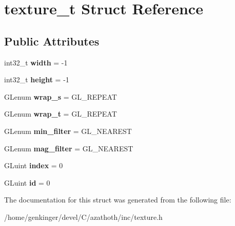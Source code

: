 \hypertarget{structtexture__t}{}\section{texture\+\_\+t Struct Reference}
\label{structtexture__t}
\subsection*{Public Attributes}
\begin{DoxyCompactItemize}
\item 
\mbox{\label{structtexture__t_a44b4ded1610f593b1e101a708d8eed67}} 
int32\+\_\+t {\bfseries width} = -\/1
\item 
\mbox{\label{structtexture__t_a864afa42205fa8cf7fcaef9b1aa972fd}} 
int32\+\_\+t {\bfseries height} = -\/1
\item 
\mbox{\label{structtexture__t_aa15f8e13840f041263afbe8dd7edf741}} 
G\+Lenum {\bfseries wrap\+\_\+s} = G\+L\+\_\+\+R\+E\+P\+E\+AT
\item 
\mbox{\label{structtexture__t_aac1199de3d773ce80db151382a6a3f1b}} 
G\+Lenum {\bfseries wrap\+\_\+t} = G\+L\+\_\+\+R\+E\+P\+E\+AT
\item 
\mbox{\label{structtexture__t_a718f2c925f57709837570351ded3e55f}} 
G\+Lenum {\bfseries min\+\_\+filter} = G\+L\+\_\+\+N\+E\+A\+R\+E\+ST
\item 
\mbox{\label{structtexture__t_a8fa4a06e9236cd45a65a8c330ffb66f4}} 
G\+Lenum {\bfseries mag\+\_\+filter} = G\+L\+\_\+\+N\+E\+A\+R\+E\+ST
\item 
\mbox{\label{structtexture__t_afd83c913baef5ef326fc1413bf1b1494}} 
G\+Luint {\bfseries index} = 0
\item 
\mbox{\label{structtexture__t_a0c732b877513c17cb9c6b73b488f1509}} 
G\+Luint {\bfseries id} = 0
\end{DoxyCompactItemize}


The documentation for this struct was generated from the following file\+:\begin{DoxyCompactItemize}
\item 
/home/genkinger/devel/\+C/azathoth/inc/texture.\+h\end{DoxyCompactItemize}
